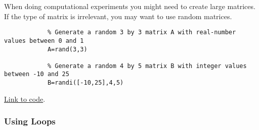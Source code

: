 \documentclass{ximera}
\begin{document}
    \begin{template}\label{temp:randMat}
        When doing computational experiments you might need to create large matrices.  If the type of matrix is irrelevant, you may want to use random matrices.
    
        \begin{verbatim}
            % Generate a random 3 by 3 matrix A with real-number values between 0 and 1
            A=rand(3,3)
            
            % Generate a random 4 by 5 matrix B with integer values between -10 and 25
            B=randi([-10,25],4,5)
        \end{verbatim}
    
    \href{https://sagecell.sagemath.org/?z=eJxtzLEKwjAUheE9kHc4S6GFFGzTjA7t0ocQhxu8aKCJEFNb397U4qTLGX44X4GRA0dKDEKkcLl7aNhXHk8puhU9FpduiExTHWZvOeJJ08wPWE4Lc8AB-YdGiv64CaVWupJCiuKP3W22-drDbruQ-Prr1s0ut0aK4UO78pSjas1ZdcpUb3XOOqE=&lang=octave&interacts=eJyLjgUAARUAuQ==}{Link to code}.    
    \end{template}

    \subsubsection*{Using Loops}
\end{document}
